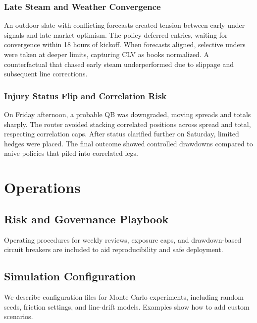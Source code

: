 \subsection{Late Steam and Weather Convergence}
An outdoor slate with conflicting forecasts created tension between early under signals and late market optimism. The policy deferred entries, waiting for convergence within 18 hours of kickoff. When forecasts aligned, selective unders were taken at deeper limits, capturing CLV as books normalized. A counterfactual that chased early steam underperformed due to slippage and subsequent line corrections.

\subsection{Injury Status Flip and Correlation Risk}
On Friday afternoon, a probable QB was downgraded, moving spreads and totals sharply. The router avoided stacking correlated positions across spread and total, respecting correlation caps. After status clarified further on Saturday, limited hedges were placed. The final outcome showed controlled drawdowns compared to naive policies that piled into correlated legs.

\chapter{Operations}\label{app:operations}


\section{Risk and Governance Playbook}\label{app:risk-gov}
Operating procedures for weekly reviews, exposure caps, and drawdown-based circuit breakers are included to aid reproducibility and safe deployment.

\section{Simulation Configuration}\label{app:sim-config}
We describe configuration files for Monte Carlo experiments, including random seeds, friction settings, and line-drift models. Examples show how to add custom scenarios.

